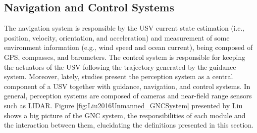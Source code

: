     \subsection{Navigation and Control Systems}
    
    The navigation system is responsible by the \ac{USV} current state estimation (i.e., position, velocity, orientation, and acceleration) and measurement of some environment information (e.g., wind speed and ocean current), being composed of \acs{GPS}, compasses, and barometers. 
    The control system is responsible for keeping the actuators of the \ac{USV} following the trajectory generated by the guidance system. 
    Moreover, lately, studies present the perception system as a central component of a \ac{USV} together with guidance, navigation, and control systems. 
    In general, perception systems are composed of cameras and near-field range sensors such as \ac{LIDAR}.
    Figure \ref{fig:Liu2016Unmanned_GNCSystem} presented by Liu \etal~\cite{Liu2016Unmanned} shows a big picture of the \ac{GNC} system, the responsibilities of each module and the interaction between them, elucidating the definitions presented in this section. 
    
    
        
        
        
